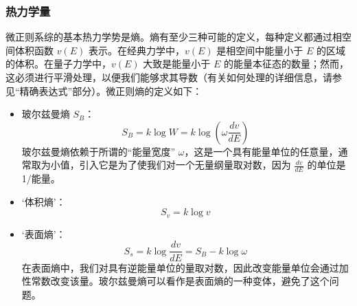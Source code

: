 \subsubsection{热力学量}  
微正则系综的基本热力学势是熵。熵有至少三种可能的定义，每种定义都通过相空间体积函数 \( v(E) \) 表示。在经典力学中，\( v(E) \) 是相空间中能量小于 \( E \) 的区域的体积。在量子力学中，\( v(E) \) 大致是能量小于 \( E \) 的能量本征态的数量；然而，这必须进行平滑处理，以便我们能够求其导数（有关如何处理的详细信息，请参见“精确表达式”部分）。微正则熵的定义如下：
\begin{itemize}
\item 玻尔兹曼熵 \( S_B \)：
\[
S_B = k \log W = k \log \left( \omega \frac{dv}{dE} \right)~
\]
玻尔兹曼熵依赖于所谓的“能量宽度” \( \omega \)，这是一个具有能量单位的任意量，通常取为小值，引入它是为了使我们对一个无量纲量取对数，因为 \( \frac{dv}{dE} \) 的单位是 1/能量。
\item ‘体积熵’：
\[
S_v = k \log v~
\]
\item ‘表面熵’：
\[
S_s = k \log \frac{dv}{dE} = S_B - k \log \omega~
\]
在表面熵中，我们对具有逆能量单位的量取对数，因此改变能量单位会通过加性常数改变该量。玻尔兹曼熵可以看作是表面熵的一种变体，避免了这个问题。
\end{itemize}